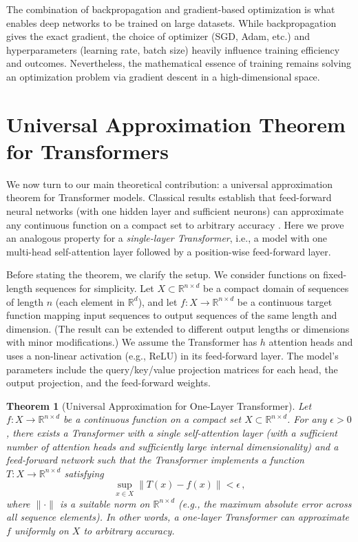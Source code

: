 \documentclass[conference]{IEEEtran}
\newtheorem{theorem}{Theorem}
\begin{document}
The combination of backpropagation and gradient-based optimization is what enables deep networks to be trained on large datasets. While backpropagation gives the exact gradient, the choice of optimizer (SGD, Adam, etc.) and hyperparameters (learning rate, batch size) heavily influence training efficiency and outcomes. Nevertheless, the mathematical essence of training remains solving an optimization problem via gradient descent in a high-dimensional space.

\section{Universal Approximation Theorem for Transformers}
We now turn to our main theoretical contribution: a universal approximation theorem for Transformer models. Classical results establish that feed-forward neural networks (with one hidden layer and sufficient neurons) can approximate any continuous function on a compact set to arbitrary accuracy \cite{cybenko1989,hornik1989}. Here we prove an analogous property for a \emph{single-layer Transformer}, i.e., a model with one multi-head self-attention layer followed by a position-wise feed-forward layer.

Before stating the theorem, we clarify the setup. We consider functions on fixed-length sequences for simplicity. Let $X \subset \mathbb{R}^{n \times d}$ be a compact domain of sequences of length $n$ (each element in $\mathbb{R}^d$), and let $f: X \to \mathbb{R}^{n \times d}$ be a continuous target function mapping input sequences to output sequences of the same length and dimension. (The result can be extended to different output lengths or dimensions with minor modifications.) We assume the Transformer has $h$ attention heads and uses a non-linear activation (e.g., ReLU) in its feed-forward layer. The model's parameters include the query/key/value projection matrices for each head, the output projection, and the feed-forward weights.

\begin{theorem}[Universal Approximation for One-Layer Transformer]
\label{thm:transformer-uat}
Let $f: X \to \mathbb{R}^{n \times d}$ be a continuous function on a compact set $X \subset \mathbb{R}^{n \times d}$. For any $\epsilon > 0$, there exists a Transformer with a single self-attention layer (with a sufficient number of attention heads and sufficiently large internal dimensionality) and a feed-forward network such that the Transformer implements a function $T: X \to \mathbb{R}^{n \times d}$ satisfying
\[
\sup_{x \in X} \big\| T(x) - f(x) \big\| < \epsilon\,,
\] 
where $\|\cdot\|$ is a suitable norm on $\mathbb{R}^{n \times d}$ (e.g., the maximum absolute error across all sequence elements). In other words, a one-layer Transformer can approximate $f$ uniformly on $X$ to arbitrary accuracy.
\end{theorem}
\end{document}
